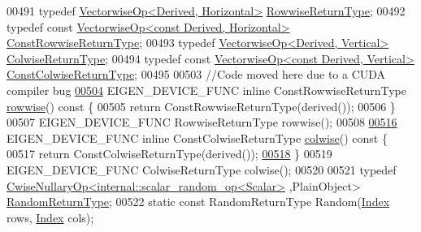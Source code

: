 \begin{DoxyCode}
00491     \textcolor{keyword}{typedef} \hyperlink{group___core___module_class_eigen_1_1_vectorwise_op}{VectorwiseOp<Derived, Horizontal>} 
      \hyperlink{group___core___module_class_eigen_1_1_vectorwise_op}{RowwiseReturnType};
00492     \textcolor{keyword}{typedef} \textcolor{keyword}{const} \hyperlink{group___core___module_class_eigen_1_1_vectorwise_op}{VectorwiseOp<const Derived, Horizontal>} 
      \hyperlink{group___core___module_class_eigen_1_1_vectorwise_op}{ConstRowwiseReturnType};
00493     \textcolor{keyword}{typedef} \hyperlink{group___core___module_class_eigen_1_1_vectorwise_op}{VectorwiseOp<Derived, Vertical>} 
      \hyperlink{group___core___module_class_eigen_1_1_vectorwise_op}{ColwiseReturnType};
00494     \textcolor{keyword}{typedef} \textcolor{keyword}{const} \hyperlink{group___core___module_class_eigen_1_1_vectorwise_op}{VectorwiseOp<const Derived, Vertical>} 
      \hyperlink{group___core___module_class_eigen_1_1_vectorwise_op}{ConstColwiseReturnType};
00495 
00503     \textcolor{comment}{//Code moved here due to a CUDA compiler bug}
\hyperlink{group___core___module_af9662cd704ffc16c5b88c7b2d331576f}{00504}     EIGEN\_DEVICE\_FUNC \textcolor{keyword}{inline} ConstRowwiseReturnType \hyperlink{group___core___module_af9662cd704ffc16c5b88c7b2d331576f}{rowwise}()\textcolor{keyword}{ const }\{
00505       \textcolor{keywordflow}{return} ConstRowwiseReturnType(derived());
00506     \}
00507     EIGEN\_DEVICE\_FUNC RowwiseReturnType rowwise();
00508 
\hyperlink{group___core___module_a978724c07b70cb9b8fdef67a4de08788}{00516}     EIGEN\_DEVICE\_FUNC \textcolor{keyword}{inline} ConstColwiseReturnType \hyperlink{group___core___module_a978724c07b70cb9b8fdef67a4de08788}{colwise}()\textcolor{keyword}{ const }\{
00517       \textcolor{keywordflow}{return} ConstColwiseReturnType(derived());
\hyperlink{group___core___module_a7c9783f4e62212b5b6eb6569f282e95c}{00518}     \}
00519     EIGEN\_DEVICE\_FUNC ColwiseReturnType colwise();
00520 
00521     \textcolor{keyword}{typedef} \hyperlink{group___core___module_class_eigen_1_1_cwise_nullary_op}{CwiseNullaryOp<internal::scalar\_random\_op<Scalar>}
      ,PlainObject> \hyperlink{group___core___module_class_eigen_1_1_cwise_nullary_op}{RandomReturnType};
00522     \textcolor{keyword}{static} \textcolor{keyword}{const} RandomReturnType Random(\hyperlink{namespace_eigen_a62e77e0933482dafde8fe197d9a2cfde}{Index} rows, \hyperlink{namespace_eigen_a62e77e0933482dafde8fe197d9a2cfde}{Index} cols);

\end{DoxyCode}
